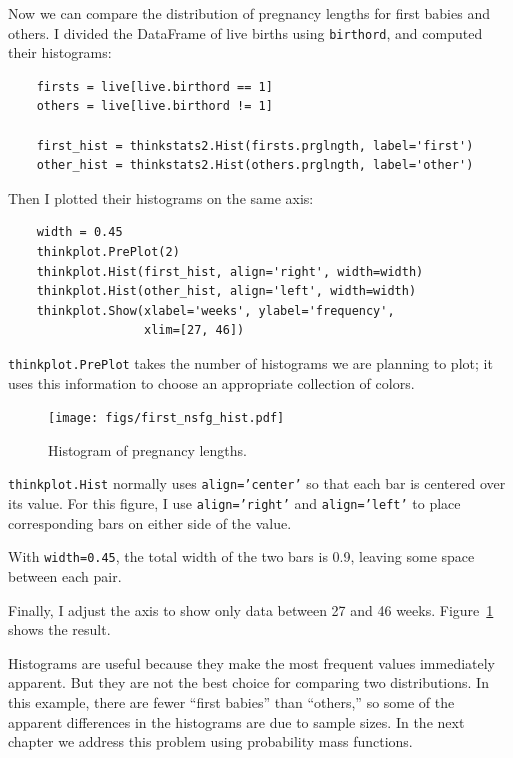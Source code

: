 \documentclass[12pt]{book}
\theoremstyle{exercise}
\begin{document}
Now we can compare the distribution of pregnancy lengths for first
babies and others.  I divided the DataFrame of live births using
{\tt birthord}, and computed their histograms:%
%
%

\begin{verbatim}
    firsts = live[live.birthord == 1]
    others = live[live.birthord != 1]

    first_hist = thinkstats2.Hist(firsts.prglngth, label='first')
    other_hist = thinkstats2.Hist(others.prglngth, label='other')
\end{verbatim}

Then I plotted their histograms on the same axis:

\begin{verbatim}
    width = 0.45
    thinkplot.PrePlot(2)
    thinkplot.Hist(first_hist, align='right', width=width)
    thinkplot.Hist(other_hist, align='left', width=width)
    thinkplot.Show(xlabel='weeks', ylabel='frequency',
                   xlim=[27, 46])
\end{verbatim}

{\tt thinkplot.PrePlot} takes the number of histograms
we are planning to plot; it uses this information to choose
an appropriate collection of colors.%

\begin{figure}
\centerline{\texttt{[image: figs/first\_nsfg\_hist.pdf]}}
\caption{Histogram of pregnancy lengths.}%
\label{first_nsfg_hist}
\end{figure}

{\tt thinkplot.Hist} normally uses {\tt align='center'} so that
each bar is centered over its value.  For this figure, I use
{\tt align='right'} and {\tt align='left'} to place
corresponding bars on either side of the value.%

With {\tt width=0.45}, the total width of the two bars is 0.9,
leaving some space between each pair.

Finally, I adjust the axis to show only data between 27 and 46 weeks.
Figure~\ref{first_nsfg_hist} shows the result.%
%

Histograms are useful because they make the most frequent values
immediately apparent.  But they are not the best choice for comparing
two distributions.  In this example, there are fewer ``first babies''
than ``others,'' so some of the apparent differences in the histograms
are due to sample sizes.  In the next chapter we address this problem
using probability mass functions.
\end{document}
